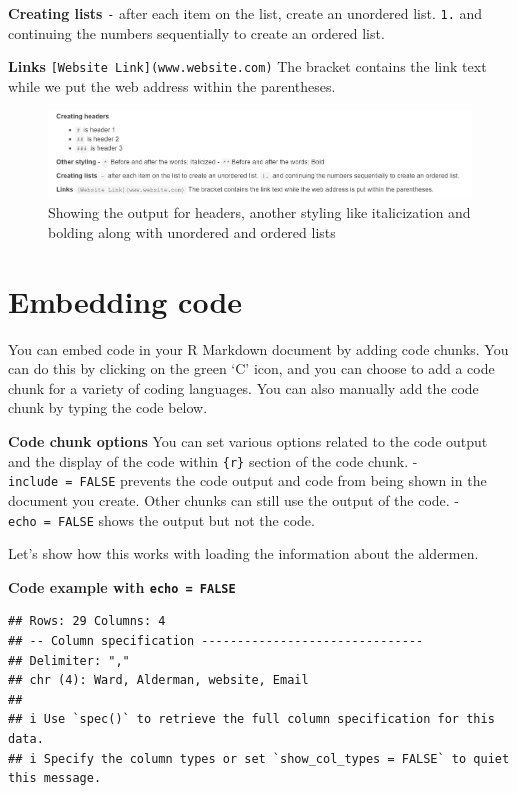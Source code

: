 \documentclass[
  krantz2]{krantz}
\begin{document}
\textbf{Creating lists}
\texttt{-} after each item on the list, create an unordered list.
\texttt{1.} and continuing the numbers sequentially to create an ordered list.

\textbf{Links}
\texttt{{[}Website\ Link{]}(www.website.com)}
The bracket contains the link text while we put the web address
within the parentheses.

\begin{figure}
\centering
\includegraphics{images/rmarkdown_2.png}
\caption{Showing the output for headers, another styling like italicization and bolding along with unordered and ordered lists}
\end{figure}

\hypertarget{embedding-code}{%
\section{Embedding code}\label{embedding-code}}

You can embed code in your R Markdown document by adding code chunks.
You can do this by clicking on the green `C' icon, and you can choose to add a code chunk for a variety of coding languages. You can also manually add the code chunk by typing the code below.

\textbf{Code chunk options}
You can set various options related to the code output and the display of the code within \texttt{\{r\}} section of the code chunk.
- \texttt{include\ =\ FALSE} prevents the code output and code from being shown in the document you create. Other chunks can still use the output of the code.
- \texttt{echo\ =\ FALSE} shows the output but not the code.

Let's show how this works with loading the information about the aldermen.

\textbf{Code example with \texttt{echo\ =\ FALSE}}

\begin{verbatim}
## Rows: 29 Columns: 4
## -- Column specification -------------------------------
## Delimiter: ","
## chr (4): Ward, Alderman, website, Email
##
## i Use `spec()` to retrieve the full column specification for this data.
## i Specify the column types or set `show_col_types = FALSE` to quiet this message.
\end{verbatim}
\end{document}
